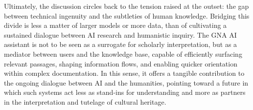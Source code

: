 \begin{spacing}{1.5}
Ultimately, the discussion circles back to the tension raised at the outset: the gap between technical ingenuity and the subtleties of human knowledge. Bridging this divide is less a matter of larger models or more data, than of cultivating a sustained dialogue between AI research and humanistic inquiry. The GNA AI assistant is not to be seen as a surrogate for scholarly interpretation, but as a mediator between users and the knowledge base, capable of efficiently surfacing relevant passages, shaping information flows, and enabling quicker orientation within complex documentation. In this sense, it offers a tangible contribution to the ongoing dialogue between AI and the humanities, pointing toward a future in which such systems act less as stand-ins for understanding and more as partners in the interpretation and tutelage of cultural heritage.

\end{spacing}